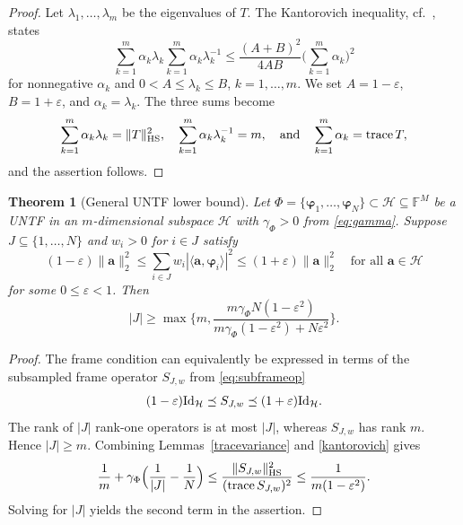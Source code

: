 \documentclass[a4paper]{amsart}
\numberwithin{equation}{section}
\newtheorem{theorem}{Theorem}[section]
\DeclareMathOperator{\trace}{trace}
\begin{document}
\begin{proof}
    Let $\lambda_1,\dots,\lambda_m$ be the eigenvalues of $T$.
    The Kantorovich inequality, cf.~\cite[Lemma on page~142]{Kan48}, states
    \begin{equation*}
        \sum_{k=1}^{m} \alpha_k \lambda_k
        \sum_{k=1}^{m} \alpha_k \lambda_k^{-1}
        \le \frac{(A+B)^2}{4AB} \Big(\sum_{k=1}^m \alpha_k\Big)^2
    \end{equation*}
    for nonnegative $\alpha_k$ and $0<A\le \lambda_k \le B$, $k=1,\dots,m$.
    We set $A = 1-\varepsilon$, $B = 1+\varepsilon$, and $\alpha_k = \lambda_k$.
    The three sums become
    \begin{equation*}
        \sum_{k=1}^m \alpha_k\lambda_k=\|T\|_{\rm HS}^2,
        \quad
        \sum_{k=1}^m \alpha_k\lambda_k^{-1}=m,
        \quad\text{and}\quad
        \sum_{k=1}^m \alpha_k=\trace T,
    \end{equation*}
    and the assertion follows.
\end{proof}

\begin{theorem}[General UNTF lower bound]\label{untfbound}
    Let $\Phi = \{\bm\varphi_1,\dots,\bm\varphi_N\}\subset\mathcal H\subseteq\mathds F^M$ be a UNTF in an $m$-dimensional subspace $\mathcal H$ with $\gamma_\Phi>0$ from \eqref{eq:gamma}.
    Suppose $J\subseteq\{1,\dots,N\}$ and $w_i>0$ for $i\in J$ satisfy
    \begin{equation*}
        (1-\varepsilon)\|\bm a\|_2^2
        \le \sum_{i\in J}w_i|\langle\bm a,\bm\varphi_i\rangle|^2
        \le (1+\varepsilon)\|\bm a\|_2^2
        \quad\text{for all }\bm a\in\mathcal H
    \end{equation*}
    for some $0\le\varepsilon<1$.
    Then
    \begin{equation*}
        |J| \ge \max\Big\{m, \frac{m\gamma_\Phi N(1-\varepsilon^2)}{m\gamma_\Phi(1-\varepsilon^2)+N\varepsilon^2} \Big\} .
    \end{equation*}
\end{theorem}

\begin{proof}
    The frame condition can equivalently be expressed in terms of the subsampled frame operator $S_{J,w}$ from \eqref{eq:subframeop}
    \begin{equation*}
        (1-\varepsilon){\rm Id}_{\mathcal H}
        \preceq S_{J,w}
        \preceq (1+\varepsilon){\rm Id}_{\mathcal H} .
    \end{equation*}
    The rank of $|J|$ rank-one operators is at most $|J|$, whereas $S_{J,w}$ has rank $m$.
    Hence $|J|\ge m$.
    Combining Lemmas~\ref{tracevariance} and \ref{kantorovich} gives
    \begin{equation*}
        \frac 1m + \gamma_\Phi\Big(\frac{1}{|J|} - \frac 1N\Big)
        \le \frac{\|S_{J,w}\|_{\rm HS}^2}{(\trace S_{J,w})^2}
        \le \frac{1}{m(1-\varepsilon^2)} .
    \end{equation*}
    Solving for $|J|$ yields the second term in the assertion.
\end{proof}
\end{document}
